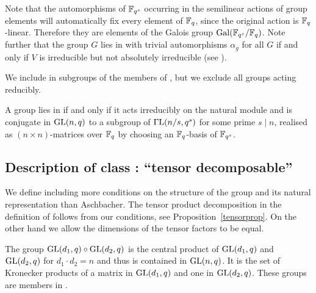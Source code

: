 Note that the automorphisms of $\mathbb{F}_{q^s}$ occurring in the semilinear
actions of group elements will automatically fix every element of $\mathbb{F}_q$, 
since the original action is $\mathbb{F}_q$-linear. Therefore they are elements of
the Galois group $\Gal(\F_{q^s}/\F_q)$. Note further that
the group $G$ lies in  
with trivial automorphisms $\alpha_g$ for all $G$ if and only if
$V$ is irreducible but not absolutely irreducible (see \cite[(29.13)]{CR0}).

\medskip
{}
We include in  subgroups of the members of , but we exclude all
groups acting reducibly.

\smallskip
\stru
A group lies in  if and only if it acts irreducibly on the natural
module and is conjugate in $\GL(n,q)$ to a subgroup of $\GGL(n/s,q^s)$ for
some prime $s \mid n$, realised as $(n \times n)$-matrices over $\mathbb{F}_q$
by choosing an $\mathbb{F}_q$-basis of $\mathbb{F}_{q^s}$.


\subsection{Description of class : ``tensor decomposable''}
\label{descD4}


We define  including more conditions on the structure of the
group and its natural representation than Aschbacher. The tensor
product decomposition in the definition of  follows from our
conditions, see Proposition~\ref{tensorprop}. On the other
hand we allow the dimensions of the tensor factors to be equal.

\smallskip
\exmemb
The group $\GL(d_1,q) \circ \GL(d_2,q)$ is the central
product of $\GL(d_1,q)$ and $\GL(d_2,q)$ for $d_1 \cdot d_2 = n$ and
thus is contained in $\GL(n,q)$. It is
the set of Kronecker products of a matrix in $\GL(d_1,q)$ and one in
$\GL(d_2,q)$. These groups are members in .


